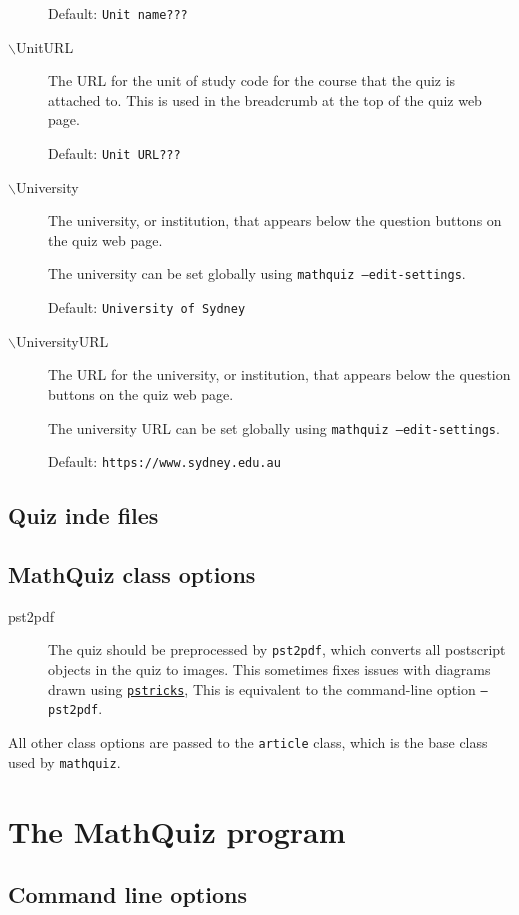 \documentclass[svgnames]{article}
\newcommand\ctan[1]{\href{https://www.ctan.org/pkg/#1}{\texttt{#1}}}
\begin{document}
\begin{description}
    Default: \texttt{Unit name???}

  \item[$\backslash$UnitURL]
    The URL for the unit of study code for the course that the quiz is attached
    to. This is used in the breadcrumb at the top of the quiz web page.

    Default: \texttt{Unit URL???}

  \item[$\backslash$University]
    The university, or institution, that appears below the question
    buttons on the quiz web page.

    The university can be set globally using \texttt{mathquiz --edit-settings}.

    Default: \texttt{University of Sydney}

  \item[$\backslash$UniversityURL]
    The URL for the university, or institution, that appears below the
    question buttons on the quiz web page.

    The university URL can be set globally using \texttt{mathquiz --edit-settings}.

    Default: \texttt{https://www.sydney.edu.au}
\end{description}

\subsection{Quiz inde files}
\subsection{MathQuiz class options}

\begin{description}
  \item[pst2pdf] The quiz should be preprocessed by \texttt{pst2pdf},
  which converts all postscript objects in the quiz to images. This
  sometimes fixes issues with diagrams drawn using \ctan{pstricks},
  This is equivalent to the command-line option \texttt{--pst2pdf}.
\end{description}

All other class options are passed to the \texttt{article} class, which is
the base class used by \texttt{mathquiz}.

\section{The MathQuiz program}
\subsection{Command line options}
\end{document}
